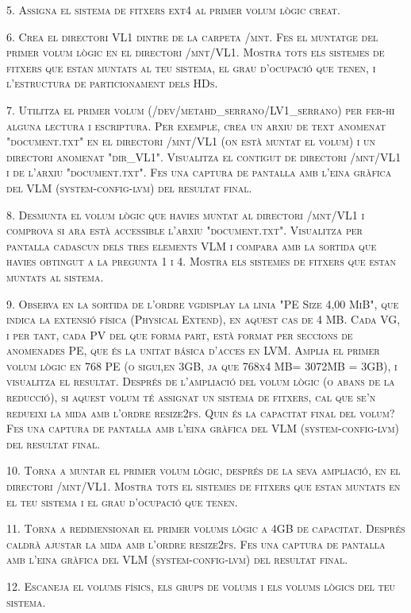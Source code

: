 \documentclass[a4paper,12pt]{article}
\begin{document}
\textsc{5. Assigna el sistema de fitxers ext4 al primer volum lògic creat.}

\textsc{6. Crea el directori VL1 dintre de la carpeta  /mnt. Fes el muntatge del primer volum lògic en el directori /mnt/VL1. Mostra tots els sistemes de fitxers que estan muntats al teu sistema, el grau d'ocupació que tenen, i l'estructura de particionament dels HDs.}

\textsc{7. Utilitza el primer volum (/dev/metahd\_serrano/LV1\_serrano) per fer-hi alguna lectura i escriptura. Per exemple, crea un arxiu de text anomenat "document.txt" en el directori /mnt/VL1 (on està muntat el volum) i un directori anomenat "dir\_VL1". Visualitza el contigut de directori /mnt/VL1 i de l'arxiu "document.txt". Fes una captura de pantalla amb l'eina gràfica del VLM (system-config-lvm) del resultat final.}


\textsc{8. Desmunta el volum lògic que havies muntat  al directori /mnt/VL1 i comprova si ara està  accessible l'arxiu "document.txt".  Visualitza per pantalla cadascun dels tres elements VLM i compara  amb la sortida que havies obtingut a la pregunta 1 i 4. Mostra els sistemes de fitxers que estan muntats al sistema.}

\textsc{9. Observa en la sortida de l'ordre vgdisplay la linia "PE Size   4,00 MiB", que indica la extensió física (Physical Extend), en aquest cas de 4 MB.  Cada VG, i per tant, cada PV del que forma part, està format per seccions de anomenades PE, que és la unitat básica d'acces en LVM. Amplia el primer volum lògic en 768 PE (o sigui,en 3GB, ja que 768x4 MB= 3072MB = 3GB), i visualitza el resultat.  Després de l'ampliació del volum lògic (o abans de la reducció), si aquest volum té assignat un sistema de fitxers, cal que se'n redueixi la mida amb l'ordre resize2fs. Quin és la capacitat final del volum? Fes una captura de pantalla amb l'eina gràfica del VLM (system-config-lvm) del resultat final.}

\textsc{10. Torna a muntar el primer volum lògic, després de la seva ampliació,  en el directori /mnt/VL1. Mostra tots el sistemes de fitxers que estan muntats en el teu sistema i el grau d'ocupació que tenen.}

\textsc{11. Torna a redimensionar el primer volums lògic a 4GB de capacitat.  Després caldrà ajustar  la mida amb l'ordre resize2fs. Fes una captura de pantalla amb l'eina gràfica del VLM (system-config-lvm) del resultat final.}

\textsc{12. Escaneja el volums físics, els grups de volums i els volums lògics del teu sistema.}
\end{document}
